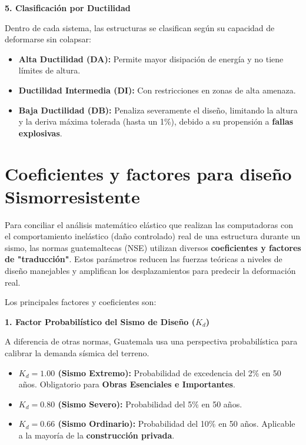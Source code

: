 \documentclass[14pt,letterpaper]{extarticle}
\begin{document}
	\textbf{5. Clasificación por Ductilidad}
	
	Dentro de cada sistema, las estructuras se clasifican según su capacidad de deformarse sin colapsar:
	
	\begin{itemize}
		\item \textbf{Alta Ductilidad (DA):} Permite mayor disipación de energía y no tiene límites de altura.
		
		\item \textbf{Ductilidad Intermedia (DI):} Con restricciones en zonas de alta amenaza.
		
		\item \textbf{Baja Ductilidad (DB):} Penaliza severamente el diseño, limitando la altura y la deriva máxima tolerada (hasta un 1\%), debido a su propensión a \textbf{fallas explosivas}.
	\end{itemize}
	
	
	
	
	



\newpage

\section{Coeficientes y factores para diseño Sismorresistente}

Para conciliar el análisis matemático elástico que realizan las computadoras con el comportamiento inelástico (daño controlado) real de una estructura durante un sismo, las normas guatemaltecas (NSE) utilizan diversos \textbf{coeficientes y factores de "traducción"}. Estos parámetros reducen las fuerzas teóricas a niveles de diseño manejables y amplifican los desplazamientos para predecir la deformación real.

Los principales factores y coeficientes son:

\textbf{1. Factor Probabilístico del Sismo de Diseño ($K_d$)}

A diferencia de otras normas, Guatemala usa una perspectiva probabilística para calibrar la demanda sísmica del terreno.

\begin{itemize}
	\item \textbf{$K_d = 1.00$ (Sismo Extremo):} Probabilidad de excedencia del 2\% en 50 años. Obligatorio para \textbf{Obras Esenciales e Importantes}.
	\item \textbf{$K_d = 0.80$ (Sismo Severo):} Probabilidad del 5\% en 50 años.
	\item \textbf{$K_d = 0.66$ (Sismo Ordinario):} Probabilidad del 10\% en 50 años. Aplicable a la mayoría de la \textbf{construcción privada}.
\end{itemize}
\end{document}
